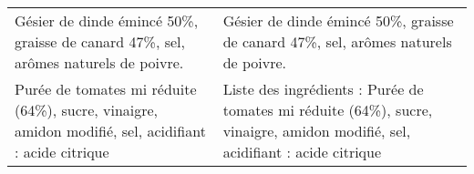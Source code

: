 \begin{longtable}{p{7cm}p{7cm}}
                                                                                                                                                                                                                     Gésier de dinde émincé 50\%, graisse de canard 47\%, sel, arômes naturels de poivre. &                                                                                                                                                                                                                    Gésier de dinde émincé 50\%,  graisse de canard 47\%, sel, arômes naturels de poivre.  \newline   \\
                                                                                                                                                                                                   Purée de tomates mi réduite (64\%), sucre, vinaigre, amidon modifié, sel, acidifiant : acide citrique &                                                                                                                                                                            Liste des ingrédients :  Purée de tomates mi réduite (64\%), sucre, vinaigre, amidon modifié, sel, acidifiant :  \newline acide citrique \\
\end{longtable}
